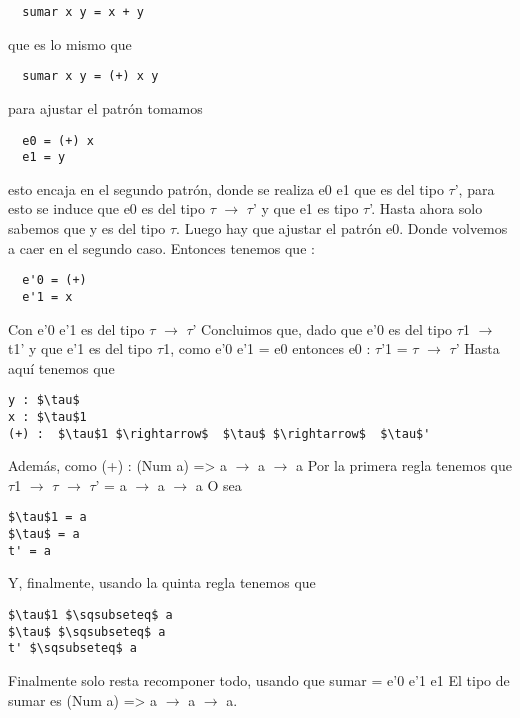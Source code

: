 \begin{lstlisting}
  sumar x y = x + y
\end{lstlisting}

que es lo mismo que

\begin{lstlisting}
  sumar x y = (+) x y
\end{lstlisting}

para ajustar el patrón tomamos

\begin{lstlisting}
  e0 = (+) x
  e1 = y
\end{lstlisting}

esto encaja en el segundo patrón, donde se realiza e0 e1 que es del tipo $\tau$', para esto se induce que e0 es del tipo $\tau$ $\rightarrow$ $\tau$' y que e1 es tipo $\tau$'. Hasta ahora solo sabemos que y es del tipo $\tau$.
Luego hay que ajustar el patrón e0. Donde volvemos a caer en el segundo caso. Entonces tenemos que :

\begin{lstlisting}
  e'0 = (+)
  e'1 = x
\end{lstlisting}

Con e'0 e'1 es del tipo $\tau$ $\rightarrow$ $\tau$'
Concluimos que, dado que e'0 es del tipo $\tau$1 $\rightarrow$ t1' y que e'1 es del tipo $\tau$1, como e'0 e'1 = e0
entonces e0 : $\tau$'1 = $\tau$ $\rightarrow$  $\tau$'
Hasta aquí tenemos que


\begin{lstlisting}[mathescape]
y : $\tau$
x : $\tau$1
(+) :  $\tau$1 $\rightarrow$  $\tau$ $\rightarrow$  $\tau$'
\end{lstlisting}

Además, como (+) : (Num a) => a $\rightarrow$ a $\rightarrow$ a
Por la primera regla tenemos que $\tau$1 $\rightarrow$  $\tau$ $\rightarrow$  $\tau$' = a $\rightarrow$ a $\rightarrow$ a
O sea

\begin{lstlisting}[mathescape]
$\tau$1 = a
$\tau$ = a
t' = a
\end{lstlisting}

Y, finalmente, usando la quinta regla tenemos que

\begin{lstlisting}[mathescape]
$\tau$1 $\sqsubseteq$ a
$\tau$ $\sqsubseteq$ a
t' $\sqsubseteq$ a
\end{lstlisting}

Finalmente solo resta recomponer todo, usando que sumar = e'0 e'1 e1
El tipo de sumar es (Num a) => a $\rightarrow$ a $\rightarrow$ a.
